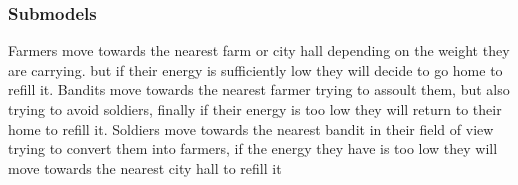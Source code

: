 \documentclass{wscpaperproc}
\theoremstyle{wsc}
\begin{document}
\subsubsection{Submodels}

Farmers move towards the nearest farm or city hall depending on the weight they
are carrying. but if their energy is sufficiently low they will decide to go
home to refill it. Bandits move towards the nearest farmer trying to assoult
them, but also trying to avoid soldiers, finally if their energy is too low
they will return to their home to refill it. Soldiers move towards the nearest
bandit in their field of view trying to convert them into farmers, if the
energy they have is too low they will move towards the nearest city hall to
refill it



\end{document}
